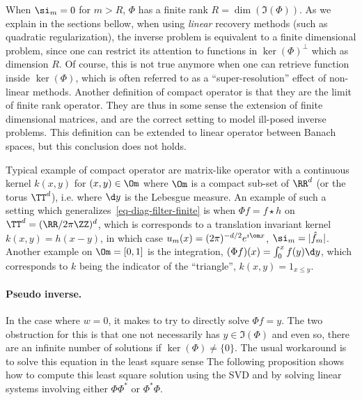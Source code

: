 When $\si_m=0$ for $m>R$, $\Phi$ has a finite rank $R=\dim(\Im(\Phi))$. As we explain in the sections bellow, when using \textit{linear} recovery methods (such as quadratic regularization), the inverse problem is equivalent to a finite dimensional problem, since one can restrict its attention to functions in $\ker(\Phi)^\bot$ which as dimension $R$. Of course, this is not true anymore when one can retrieve function inside $\ker(\Phi)$, which is often referred to as a ``super-resolution'' effect of non-linear methods.
%
Another definition of compact operator is that they are the limit of finite rank operator. They are thus in some sense the extension of finite dimensional matrices, and are the correct setting to model ill-posed inverse problems. This definition can be extended to linear operator between Banach spaces, but this conclusion does not holds.

Typical example of compact operator are matrix-like operator with a continuous kernel $k(x,y)$ for $(x,y) \in \Om$ where $\Om$ is a compact sub-set of $\RR^d$ (or the torus $\TT^d$), i.e.
where $\d y$ is the Lebesgue measure. 
%
An example of such a setting which generalizes~\eqref{eq-diag-filter-finite} is when $\Phi f = f \star h$ on $\TT^d=(\RR/2\pi\ZZ)^d$, which is corresponds to a translation invariant kernel $k(x,y) = h(x-y)$, in which case $u_m(x)=(2\pi)^{-d/2} e^{\imath \om x}$, $\si_m = |\hat f_m|$.
% 
Another example on $\Om=[0,1]$ is the integration, $(\Phi f)(x) = \int_{0}^x f(y) \d y$, which corresponds to $k$ being the indicator of the ``triangle'', $k(x,y)=1_{x \leq y}$.



\paragraph{Pseudo inverse.}

In the case where $w=0$, it makes to try to directly solve $\Phi f = y$. The two obstruction for this is that one not necessarily has $y \in \Im(\Phi)$ and even so, there are an infinite number of solutions if $\ker(\Phi) \neq \{0\}$. The usual workaround is to solve this equation in the least square sense 
The following proposition shows how to compute this least square solution using the SVD and by solving linear systems involving either $\Phi\Phi^*$ or $\Phi^*\Phi$. 

